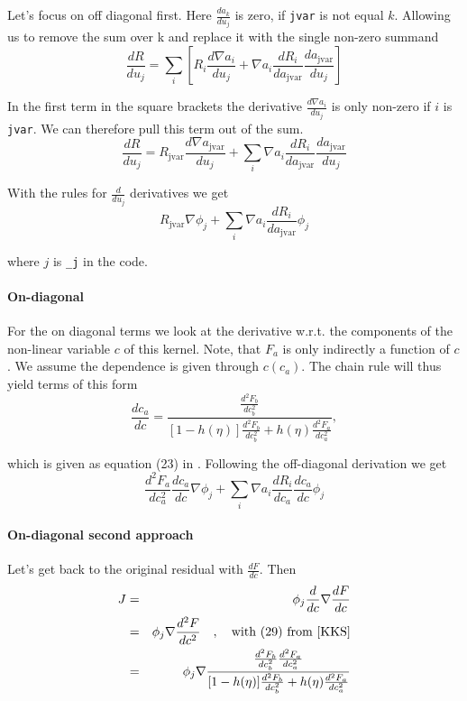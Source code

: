 \documentclass[]{article}
\begin{document}
Let's focus on off diagonal first. Here $\frac{da_k}{du_j}$ is zero, if \texttt{jvar} is not equal $k$. Allowing us to remove the sum over k and replace it with the single non-zero summand
\[
\frac{dR}{du_j} = \sum_i \left[  R_i\frac{d\nabla a_i}{du_j} + \nabla a_i \frac {dR_i}{da_\text{jvar}}\frac{da_\text{jvar}}{du_j} \right] 
\]

In the first term in the square brackets the derivative $\frac{d\nabla a_i}{du_j}$ is only non-zero if $i$ is \texttt{jvar}. We can therefore pull this term out of the sum.
\[
\frac{dR}{du_j} = R_\text{jvar}\frac{d\nabla a_\text{jvar}}{du_j} + \sum_i  \nabla a_i \frac {dR_i}{da_\text{jvar}}\frac{da_\text{jvar}}{du_j} 
\]

With the rules for $\frac d{du_j}$ derivatives we get
\[
 R_\text{jvar} \nabla \phi_j + \sum_i \nabla a_i \frac {dR_i}{da_\text{jvar}} \phi_j 
\]

where $j$ is \texttt{\_j} in the code.

\paragraph{On-diagonal}

For the on diagonal terms we look at the derivative w.r.t. the components of the non-linear variable $c$ of this kernel. Note, that $F_a$ is only indirectly a function of $c$. We assume the dependence is given through $c(c_a)$. The chain rule will thus yield terms of this form  
\[
\frac{dc_a}{dc} = \frac{\frac{d^2F_b}{dc_b^2}}{[1-h(\eta)]\frac{d^2F_b}{dc_b^2}+h(\eta)\frac{d^2F_a}{dc_a^2}},
\]

which is given as equation (23) in \cite{KKS}. Following the off-diagonal  derivation we get
\[
\frac{d^2F_a}{dc_a^2}\frac{dc_a}{dc} \nabla \phi_j + \sum_i \nabla a_i \frac {dR_i}{dc_a} \frac{dc_a}{dc} \phi_j 
\]

\paragraph{On-diagonal second approach}
Let's get back to the original residual with $\frac{dF}{dc}$. Then
\begin{eqnarray*}
J &=& \phi_j \frac{d}{dc} \nabla \frac{dF}{dc}\\
  &=& \phi_j  \nabla \frac{d^2F}{dc^2} \quad,\quad \text{with (29) from \cite{KKS}}\\
  &=& \phi_j  \nabla \frac{\frac{d^2F_b}{dc_b^2}\frac{d^2F_a}{dc_a^2}}{  [1-h(\eta)]\frac{d^2F_b}{dc_b^2}+h(\eta)\frac{d^2F_a}{dc_a^2} }\\
\end{eqnarray*}
\end{document}
